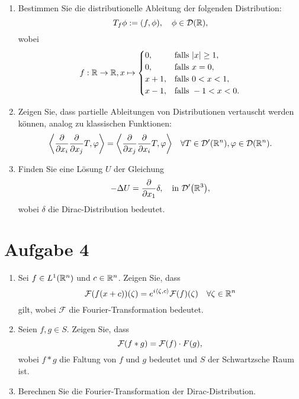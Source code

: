 \documentclass{exercise}
\begin{document}
    \begin{problem}
        \begin{enumerate}
            \item Bestimmen Sie die distributionelle Ableitung der folgenden Distribution:
            \[
                T_f \phi := \parentheses*{f, \phi}, \quad \phi \in \mathcal{D}\parentheses*{\R},
            \]
            wobei
            \[
                f: \R \to \R, x \mapsto \begin{cases}
                    0, & \text{falls }\absolute*{x} \ge 1,\\
                    0, & \text{falls }x = 0,\\
                    x + 1, & \text{falls }0 < x < 1,\\
                    x - 1, & \text{falls }-1 < x < 0.
                \end{cases}
            \]
            \item Zeigen Sie, dass partielle Ableitungen von Distributionen vertauscht werden können, analog zu klassischen Funktionen:
            \[
                \angles*{\frac{\partial}{\partial x_i}\frac{\partial}{\partial x_j}T, \varphi} = \angles*{\frac{\partial}{\partial x_j}\frac{\partial}{\partial x_i}T, \varphi} \quad \forall T \in \mathcal{D}'\parentheses*{\R^n}, \varphi \in \mathcal{D}\parentheses*{\R^n}.
            \]
            \item Finden Sie eine Lösung \(U\) der Gleichung
            \[
                -\Delta U = \frac{\partial}{\partial x_1}\delta, \quad \text{in }\mathcal{D}'\parentheses*{\R^3},
            \]
            wobei \(\delta\) die Dirac-Distribution bedeutet.
        \end{enumerate}
    \end{problem}


    \section*{Aufgabe 4}

    \begin{problem}
        \begin{enumerate}
            \item Sei \(f \in L^1\parentheses*{\R^n}\) und \(c \in \mathbb{R}^n\).
            Zeigen Sie, dass
            \[
                \mathcal{F}\parentheses*{f\parentheses*{x + c}}\parentheses*{\zeta} = e^{i\angles*{\zeta, c}}\mathcal{F}\parentheses*{f}\parentheses*{\zeta} \quad \forall\zeta \in \R^n
            \]
            gilt, wobei \(\mathcal{F}\) die Fourier-Transformation bedeutet.
            \item Seien \(f, g \in S\).
            Zeigen Sie, dass
            \[
                \mathcal{F}\parentheses*{f * g} = \mathcal{F}\parentheses*{f} \cdot F\parentheses*{g},
            \]
            wobei \(f * g\) die Faltung von \(f\) und \(g\) bedeutet und \(S\) der Schwartzsche Raum ist.
            \item Berechnen Sie die Fourier-Transformation der Dirac-Distribution.
        \end{enumerate}
    \end{problem}
\end{document}
